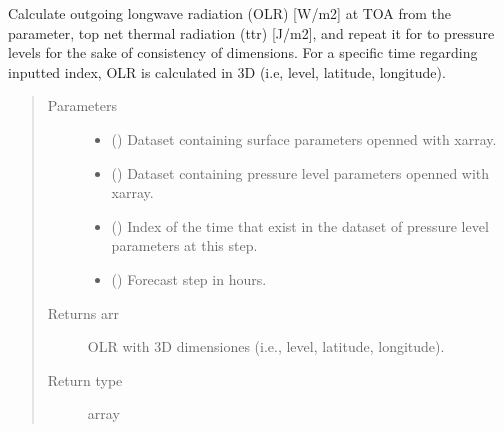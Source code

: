 \documentclass[a4paper,11pt,english]{sphinxmanual}
\begin{document}
\begin{fulllineitems}
\label{\detokenize{envlib:envlib.processing_surf_vars.extend_olr_pl_4d}}
Calculate outgoing longwave radiation (OLR) {[}W/m2{]} at TOA from the parameter, top net thermal radiation (ttr)
{[}J/m2{]}, and repeat it for to pressure levels for the sake of consistency of dimensions. For a specific time
regarding inputted index, OLR is calculated in 3D (i.e, level, latitude, longitude).
\begin{quote}\begin{description}
\item[{Parameters}] \leavevmode\begin{itemize}
\item {} 
 () \textendash{} Dataset containing surface parameters openned with xarray.

\item {} 
 () \textendash{} Dataset containing pressure level parameters openned with xarray.

\item {} 
 () \textendash{} Index of the time that exist in the dataset of pressure level parameters at this step.

\item {} 
 () \textendash{} Forecast step in hours.

\end{itemize}

\item[{Returns arr}] \leavevmode
OLR with 3D dimensiones (i.e., level, latitude, longitude).

\item[{Return type}] \leavevmode
array

\end{description}\end{quote}

\end{fulllineitems}
\end{document}
